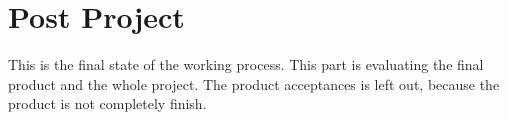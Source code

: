 \chapter{Post Project}
This is the final state of the working process. This part is evaluating the final product and the whole project. The product acceptances is left out, because the product is not completely finish.
\newpage
\newpage
